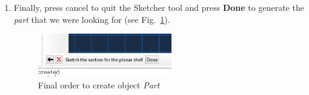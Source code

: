 \begin{enumerate}
\begin{enumerate}
  \item Finally, press cancel to quit the Sketcher tool and press
    \textbf{Done} to generate the \textit {part} that we were looking
    for (see Fig.~\ref{figu08}).
    \begin{figure}[!h]
      \begin{center}
        \includegraphics[width=0.55\textwidth]{./body/images/imagen08}
      \end{center}
      \caption{Final order to create object \textit{Part}}
      \label{figu08}
    \end{figure}
  \end{enumerate}



\end{enumerate}
